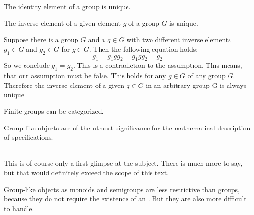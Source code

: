 \documentclass[landscape, slides, light]{mmiss2}[19.02.2002]
\begin{document}
\begin{Package}
\begin{Section}
\begin{Section}[Title={Mathematical Background},Label=Section1.4]
\begin{Paragraph}[Label=para14]
\begin{Corollary}[Notation=Algebra,Label=Corollary1.4.1.1,Title={Uniqueness 1b}]
The identity element of a group is unique.
\end{Corollary}
\newline
\begin{Theorem}[Notation=Algebra,Label=Theorem1.4.2,Title={Uniqueness 2}]
The inverse element of a given element $g$ of a group $G$ is unique.
\end{Theorem}

\begin{Proof}[Notation=Algebra,Label=Proof1.4.2.1,Title=Contradiction]
Suppose there is a group $G$ and a $g \in G$  with two different
inverse elements $g_{1} \in G$ and $g_{2} \in G$ for $g \in G$. Then
the following equation holds:
\begin{displaymath}
g_{1}=g_{1}gg_{2}=g_{1}gg_{2}=g_{2}
\end{displaymath}
So we conclude $g_{1}=g_{2}$. This is a contradiction to the
assumption. This means, that our assumption must be false. This holds
for any $g \in G$ of any group $G$. Therefore the inverse element of a
given $g \in G$ in an arbitrary group G is always unique.
\end{Proof}
\newline
\begin{Assertion}[Notation=Algebra,Label=Assertion1.4.1,Title={Finite Groups}]
Finite groups can be categorized. 
\end{Assertion}

\begin{Conjecture}[Notation=Specifications,Label=Conjecture1.4.1,Title={Mathematics of Specifications}]
Group-like objects are of the utmost significance for the
mathematical description of specifications.
\end{Conjecture}
\newline
\hfill \\
This is of course only a first glimpse at the subject. There is much
more to say, but that would definitely exceed the scope of this text.
\end{Paragraph}
\begin{Paragraph}[Title=Remark,Label=para15]
Group-like objects as monoids and semigroups are less restrictive than
groups, because they do not require the existence of an
. But they are also more difficult
 to handle.
\end{Paragraph}
\end{Section}

\end{Section}

\end{Package}
\end{document}
